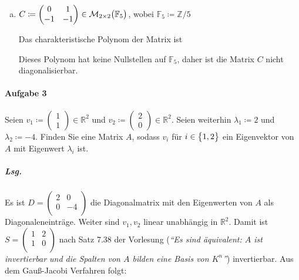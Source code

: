 \documentclass{scrreprt}
\begin{document}
\begin{enumerate}[(a)]
\item $C \coloneqq \begin{pmatrix}
    0 & 1 \\
    -1 & -1 \\
  \end{pmatrix} \in \mathcal{M}_{2 \times 2}\qty\big(\mathbb{F}_5)$, wobei
  $\mathbb{F}_5 \coloneqq \mathbb{Z}/5$

  Das charakteristische Polynom der Matrix ist
  Dieses Polynom hat keine Nullstellen auf $\mathbb{F}_5$, daher ist die Matrix
  $C$ nicht diagonalisierbar.
\end{enumerate}

\newpage
\paragraph{Aufgabe 3} Seien $v_1 \coloneqq \begin{pmatrix}1\\1\end{pmatrix} \in
\mathbb{R}^2$ und $v_2 \coloneqq \begin{pmatrix}2\\0\end{pmatrix} \in
\mathbb{R}^2$.
Seien weiterhin $\lambda_1 \coloneqq 2$ und $\lambda_2 \coloneqq -4$.
Finden Sie eine Matrix $A$, sodass $v_i$ für $i \in \qty\big{1, 2}$ ein
Eigenvektor von $A$ mit Eigenwert $\lambda_i$ ist.

\subparagraph{Lsg.} Es ist $D = \begin{pmatrix}
  2 & 0 \\
  0 & -4 \\
\end{pmatrix}$ die Diagonalmatrix mit den Eigenwerten von $A$ als
Diagonaleneinträge.
Weiter sind $v_1, v_2$ linear unabhängig in $\mathbb{R}^2$.
Damit ist $S = \begin{pmatrix}
  1 & 2 \\
  1 & 0 \\
\end{pmatrix}$ nach Satz 7.38 der Vorlesung (\emph{``Es sind äquivalent:
  $A$ ist invertierbar und die Spalten von $A$ bilden eine Basis von $K^n$''})
invertierbar.
Aus dem Gauß-Jacobi Verfahren folgt:
\end{document}
